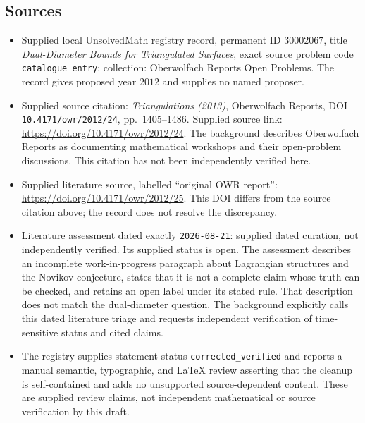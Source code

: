 \documentclass[11pt]{article}
\begin{document}
\subsection{Sources}
\begin{itemize}
\item Supplied local UnsolvedMath registry record, permanent ID \(30002067\), title \emph{Dual-Diameter Bounds for Triangulated Surfaces}, exact source problem code \texttt{catalogue entry}; collection: Oberwolfach Reports Open Problems. The record gives proposed year \(2012\) and supplies no named proposer.
\item Supplied source citation: \emph{Triangulations (2013)}, Oberwolfach Reports, DOI \texttt{10.4171/owr/2012/24}, pp.\ 1405--1486. Supplied source link: \url{https://doi.org/10.4171/owr/2012/24}. The background describes Oberwolfach Reports as documenting mathematical workshops and their open-problem discussions. This citation has not been independently verified here.
\item Supplied literature source, labelled ``original OWR report'': \url{https://doi.org/10.4171/owr/2012/25}. This DOI differs from the source citation above; the record does not resolve the discrepancy.
\item Literature assessment dated exactly \texttt{2026-08-21}: supplied dated curation, not independently verified. Its supplied status is open. The assessment describes an incomplete work-in-progress paragraph about Lagrangian structures and the Novikov conjecture, states that it is not a complete claim whose truth can be checked, and retains an open label under its stated rule. That description does not match the dual-diameter question. The background explicitly calls this dated literature triage and requests independent verification of time-sensitive status and cited claims.
\item The registry supplies statement status \texttt{corrected\_verified} and reports a manual semantic, typographic, and LaTeX review asserting that the cleanup is self-contained and adds no unsupported source-dependent content. These are supplied review claims, not independent mathematical or source verification by this draft.
\end{itemize}
\end{document}
